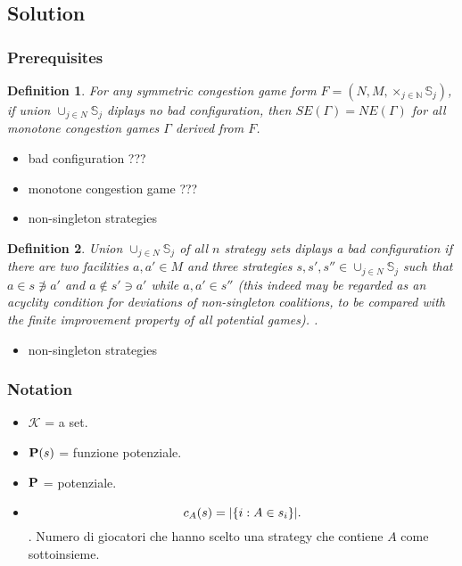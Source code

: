 \documentclass{article}
\newtheorem{defn}{Definition}
\begin{document}
\subsection{Solution}
\subsubsection{Prerequisites}

\begin{defn}
	For any \emph{symmetric congestion game form} $F = (N, M, \times_{j \in \mathbb{N}} \mathbb{S}_j )$, if union $\cup_{j \in N} \mathbb{S}_j$ diplays no bad configuration, then $SE(\Gamma) = NE(\Gamma)$ for all monotone congestion games $\Gamma$ derived from $F$.
\end{defn}
\begin{itemize}
	\item bad configuration ???
	\item monotone congestion game ???
	\item non-singleton strategies
\end{itemize}

\begin{defn}
	Union $\cup_{j \in N} \mathbb{S}_j$ of all $n$ strategy sets diplays a \emph{bad configuration} if there are two facilities $a, a' \in M$ and three strategies $s, s', s'' \in \cup_{j \in N} \mathbb{S}_j$ such that $a \in s \not\owns a'$ and $a \not\in s' \owns a'$ while $a, a' \in s''$ (this indeed may be regarded as an acyclity condition for deviations of non-singleton coalitions, to be compared with the finite improvement property of all potential games). \cite{rossi01}.
\end{defn}
\begin{itemize}
	\item non-singleton strategies
\end{itemize}

\subsubsection{Notation}
\begin{itemize}
	\item $\mathcal{K}$ = a set.
	\item $\textbf P(s)$ = funzione potenziale.
	\item $\textbf P$ = potenziale.
	\item $$c_A(s)=|\{i:A\in s_i\}|\text .$$. Numero di giocatori che hanno scelto una strategy che contiene $A$ come sottoinsieme.
\end{itemize}
\end{document}
